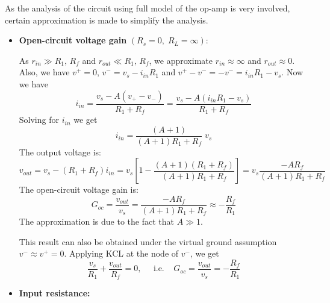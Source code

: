 \documentclass{article}
\begin{document}
\begin{itemize}
  As the analysis of the circuit using full model of the op-amp 
  is very involved, certain approximation is made to simplify the 
  analysis.
  \begin{itemize}
  \item {\bf Open-circuit voltage gain} $(R_s=0,\;R_L=\infty)$:

    As $r_{in}\gg R_1,\,R_f$ and $r_{out}\ll R_1,\,R_f$, we approximate
    $r_{in}\approx \infty$ and $r_{out}\approx 0$. Also, we have
    $v^+=0$, $v^-=v_s-i_{in} R_1$ and $v^+-v^-=-v^-=i_{in} R_1 -v_s$.
    Now we have
    \begin{equation}
      i_{in}=\frac{v_s-A(v_+-v_-)}{R_1+R_f}=\frac{v_s-A(i_{in} R_1-v_s)}{R_1+R_f}
    \end{equation}
    Solving for $i_{in}$ we get
    \begin{equation}
      i_{in}=\frac{(A+1)}{(A+1)R_1+R_f}\;v_s
    \end{equation}
    The output voltage is:
    \begin{equation}
      v_{out}=v_s-(R_1+R_f) i_{in}
      =v_s\left[1-\frac{(A+1)(R_1+R_f)}{(A+1)R_1+R_f}\right] 
      =v_s\frac{-AR_f}{(A+1)R_1+R_f}
    \end{equation} 
    The open-circuit voltage gain is:
    \begin{equation}
      G_{oc}=\frac{v_{out}}{v_s}=\frac{-AR_f}{(A+1)R_1+R_f}
      \approx - \frac{R_f}{R_1} 
    \end{equation}
    The approximation is due to the fact that $A\gg 1$.

    This result can also be obtained under the virtual ground assumption
    $v^-\approx v^+=0$. Applying KCL at the node of $v^-$, we get
    \begin{equation}
      \frac{v_s}{R_1}+\frac{v_{out}}{R_f}=0,\;\;\;\;\;\mbox{i.e.}\;\;\;\;
      G_{oc}=\frac{v_{out}}{v_s}=-\frac{R_f}{R_1}
    \end{equation}

   \item {\bf Input resistance:} 


\end{itemize}
\end{itemize}
\end{document}

